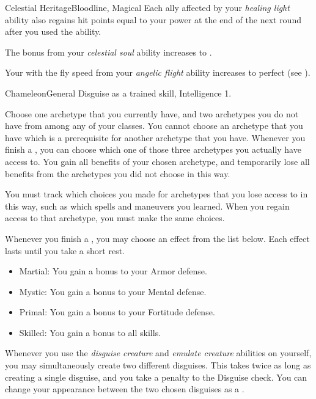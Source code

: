 \begin{feat}{Celestial Heritage}{Bloodline, Magical}
         Each ally affected by your \textit{healing light} ability also regains hit points equal to your power at the end of the next round after you used the  ability.

         The bonus from your \textit{celestial soul} ability increases to .

         Your  with the fly speed from your \textit{angelic flight} ability increases to perfect (see ).
    \end{feat}

    \begin{feat}{Chameleon}{General}
        \featpre Disguise as a trained skill, Intelligence 1.

         Choose one archetype that you currently have, and two archetypes you do not have from among any of your classes.
        You cannot choose an archetype that you have which is a prerequisite for another archetype that you have.
        Whenever you finish a , you can choose which one of those three archetypes you actually have access to.
        You gain all benefits of your chosen archetype, and temporarily lose all benefits from the archetypes you did not choose in this way.

        You must track which choices you made for archetypes that you lose access to in this way, such as which spells and maneuvers you learned.
        When you regain access to that archetype, you must make the same choices.

         Whenever you finish a , you may choose an effect from the list below.
        Each effect lasts until you take a short rest.
        \begin{itemize}
            \item Martial: You gain a  bonus to your Armor defense.
            \item Mystic: You gain a  bonus to your Mental defense.
            \item Primal: You gain a  bonus to your Fortitude defense.
            \item Skilled: You gain a  bonus to all skills.
        \end{itemize}

         Whenever you use the \textit{disguise creature} and \textit{emulate creature} abilities on yourself, you may simultaneously create two different disguises.
        This takes twice as long as creating a single disguise, and you take a  penalty to the Disguise check.
        You can change your appearance between the two chosen disguises as a .


\end{feat}
